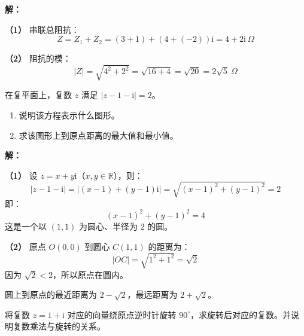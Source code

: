 \documentclass[12pt, a4paper]{ctexart}
\begin{document}
\textbf{解：}

\textbf{（1）} 串联总阻抗：
\[
  Z = Z_1 + Z_2 = (3 + 1) + (4 + (-2))\mathrm{i} = 4 + 2\mathrm{i}\ \Omega
\]

\textbf{（2）} 阻抗的模：
\[
  |Z| = \sqrt{4^2 + 2^2} = \sqrt{16 + 4} = \sqrt{20} = 2\sqrt{5}\ \Omega
\]

\vspace{6pt}

\begin{appbox}[【应用2】复平面上的轨迹问题]
在复平面上，复数 $z$ 满足 $|z - 1 - \mathrm{i}| = 2$。
\begin{enumerate}[leftmargin=2em]
  \item 说明该方程表示什么图形。
  \item 求该图形上到原点距离的最大值和最小值。
\end{enumerate}
\end{appbox}

\textbf{解：}

\textbf{（1）} 设 $z = x + y\mathrm{i}$（$x, y \in \mathbb{R}$），则：
\[
  |z - 1 - \mathrm{i}| = |(x-1) + (y-1)\mathrm{i}| = \sqrt{(x-1)^2 + (y-1)^2} = 2
\]
即：
\[
  (x-1)^2 + (y-1)^2 = 4
\]
这是一个以 $(1, 1)$ 为圆心、半径为 $2$ 的圆。

\begin{center}
\end{center}

\textbf{（2）} 原点 $O(0,0)$ 到圆心 $C(1,1)$ 的距离为：
\[
  |OC| = \sqrt{1^2 + 1^2} = \sqrt{2}
\]
因为 $\sqrt{2} < 2$，所以原点在圆内。

圆上到原点的最近距离为 $2 - \sqrt{2}$，最远距离为 $2 + \sqrt{2}$。

\vspace{6pt}

\begin{appbox}[【应用3】复数与旋转]
将复数 $z = 1 + \mathrm{i}$ 对应的向量绕原点逆时针旋转 $90^{\circ}$，求旋转后对应的复数。并说明复数乘法与旋转的关系。
\end{appbox}
\end{document}
